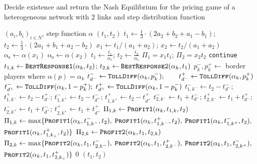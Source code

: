 \documentclass[10pt,a4paper]{book}
\newcommand{\as}{\mathrm{\alpha_s}}
\theoremstyle{definition}
\theoremstyle{comment}
\begin{document}
\begin{algorithm}
	\caption{Decide existence and return the Nash Equilibrium for the pricing game of a heterogeneous network with $2$ links and step distribution function}
	\label{algorithm:step_ne_pricing}
	\begin{algorithmic}[1]
		\Require $(a_i, b_i)_{i \in N}$, step function $\alpha$
		\Ensure $(t_1, t_2)$
		\State $t_1 \gets \frac13 \cdot (2 a_2 + b_2 + a_1 - b_1)$;\; $t_2 \gets \frac13 \cdot (2 a_1 + b_1 + a_2 - b_2)$
		\State $x_1 \gets t_1 / (a_1 + a_2)$;\; $x_2 \gets t_2 / (a_1 + a_2)$
		\State $\as \gets \alpha(x_1)$
		\Else
		\State $\as \gets \alpha(x_2)$
		\EndIf
		\State $t_1 \gets \frac{t_1}{\alpha_s}$;\; $t_2 \gets \frac{t_2}{\alpha_s}$
		\State $\Pi_1 = x_1 t_1$;\; $\Pi_2 = x_2 t_2$
		\If{$\alpha_k = \as$}
		\State \texttt{continue}
		\EndIf
		\State $t_{1, k} \gets \Call{\texttt{BestResponse1}}{\alpha_k, t_2}$;\; $t_{2, k} \gets \Call{\texttt{BestResponse2}}{\alpha_k, t_1}$
		\State $p_k^-, p_k^+ \gets$ border players where $\alpha(p) = \alpha_k$
		\State $t_{d^-}^- \gets \Call{\texttt{TollDiff}}{\alpha_k, p_k^-};\qquad t_{d^-}^+ \gets \Call{\texttt{TollDiff}}{\alpha_k, p_k^+}$
		\State $t_{d^+}^- \gets \Call{\texttt{TollDiff}}{\alpha_k, 1 - p_k^+};\; t_{d^+}^+ \gets \Call{\texttt{TollDiff}}{\alpha_k, 1 - p_k^-}$
		\State $t_{1, k^-}^- \gets t_2 - t_{d^-}^-$;\; $t_{1, k^-}^+ \gets t_2 - t_{d^-}^+$;\; $t_{1, k^+}^- \gets t_2 - t_{d^+}^-$;\; $t_{1, k^+}^+ \gets t_2 - t_{d^+}^+$
		\State $t_{2, k^-}^- \gets t_1 + t_{d^-}^-$;\; $t_{2, k^-}^+ \gets t_1 + t_{d^-}^+$;\; $t_{2, k^+}^- \gets t_1 + t_{d^+}^-$;\; $t_{2, k^+}^+ \gets t_1 + t_{d^+}^+$
		\State $\Pi_{1, k} \gets \Call{\texttt{Profit1}}{\alpha_k, t_{1, k}, t_2}$
		\Else
		\State $\Pi_{1, k} \gets \max\{\Call{\texttt{Profit1}}{\alpha_k, t_{1, k^-}^-, t_2},$ $\Call{\texttt{Profit1}}{\alpha_k, t_{1, k^-}^+, t_2},$
		\Statex \hspace{8.5em} $\Call{\texttt{Profit1}}{\alpha_k, t_{1, k^+}^-, t_2},$ $\Call{\texttt{Profit1}}{\alpha_k, t_{1, k_+}^+, t_2}\}$
		\EndIf
		\State $\Pi_{2, k} \gets \Call{\texttt{Profit2}}{\alpha_k, t_1, t_{2, k}}$
		\Else
		\State $\Pi_{2, k} \gets \max\{\Call{\texttt{Profit2}}{\alpha_k, t_1, t_{2, k^-}^-},$  $\Call{\texttt{Profit2}}{\alpha_k, t_1, t_{2, k^-}^+},$
		\Statex \hspace{8.5em} $\Call{\texttt{Profit2}}{\alpha_k, t_1, t_{2, k^+}^-},$ $\Call{\texttt{Profit2}}{\alpha_k, t_1, t_{2, k_+}^+}\}$
		\EndIf
		\State \Return $0$
		\EndIf
		\EndFor
		\State \Return $(t_1, t_2)$
	\end{algorithmic}
\end{algorithm}
\end{document}
